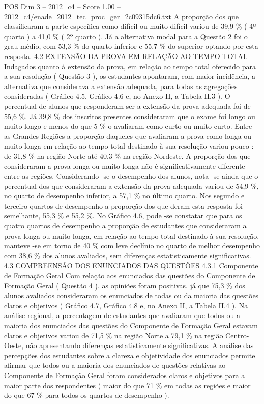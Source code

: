 \begin{textsample}{POS Dim 3 – 2012\_c4 – Score 1.00 – 2012\_c4/enade\_2012\_tec\_proc\_ger\_2c09315dc6.txt}
A proporção dos que classificaram a parte específica como difícil ou muito difícil variou de 39,9 \% ( 4º quarto ) a 41,0 \% ( 2º quarto ).
Já a alternativa modal para a Questão 2 foi o grau médio, com 53,3 \% do quarto inferior e 55,7 \% do superior optando por esta resposta. 4.2 EXTENSÃO DA PROVA EM RELAÇÃO AO TEMPO TOTAL Indagados quanto à extensão da prova, em relação ao tempo total oferecido para a sua resolução ( Questão 3 ), os estudantes apontaram, com maior incidência, a alternativa que considerava a extensão adequada, para todas as agregações consideradas ( Gráfico 4.5, Gráfico 4.6 e, no Anexo II, a Tabela II.3 ).
O percentual de alunos que responderam ser a extensão da prova adequada foi de 55,6 \%.
Já 39,8 \% dos inscritos presentes consideraram que o exame foi longo ou muito longo e menos do que 5 \% o avaliaram como curto ou muito curto.
Entre as Grandes Regiões a proporção daqueles que avaliaram a prova como longa ou muito longa em relação ao tempo total destinado à sua resolução variou pouco : de 31,8 \% na região Norte até 40,3 \% na região Nordeste.
A proporção dos que consideraram a prova longa ou muito longa não é significativamente diferente entre as regiões.
Considerando -se o desempenho dos alunos, nota -se ainda que o percentual dos que consideraram a extensão da prova adequada variou de 54,9 \%, no quarto de desempenho inferior, a 57,1 \% no último quarto.
Nos segundo e terceiro quartos de desempenho a proporção dos que deram esta resposta foi semelhante, 55,3 \% e 55,2 \%.
No Gráfico 4.6, pode -se constatar que para os quatro quartos de desempenho a proporção de estudantes que consideraram a prova longa ou muito longa, em relação ao tempo total destinado à sua resolução, manteve -se em torno de 40 \% com leve declínio no quarto de melhor desempenho com 38,6 \% dos alunos avaliados, sem diferenças estatisticamente significativas. 4.3 COMPREENSÃO DOS ENUNCIADOS DAS QUESTÕES 4.3.1 Componente de Formação Geral Com relação aos enunciados das questões do Componente de Formação Geral ( Questão 4 ), as opiniões foram positivas, já que 75,3 \% dos alunos avaliados consideraram os enunciados de todas ou da maioria das questões claros e objetivos ( Gráfico 4.7, Gráfico 4.8 e, no Anexo II, a Tabela II.4 ).
Na análise regional, a percentagem de estudantes que avaliaram que todos ou a maioria dos enunciados das questões do Componente de Formação Geral estavam claros e objetivos variou de 71,5 \% na região Norte a 79,1 \% na região Centro-Oeste, não apresentando diferenças estatisticamente significativas.
A análise das percepções dos estudantes sobre a clareza e objetividade dos enunciados permite afirmar que todos ou a maioria dos enunciados de questões relativas ao Componente de Formação Geral foram considerados claros e objetivos para a maior parte dos respondentes ( maior do que 71 \% em todas as regiões e maior do que 67 \% para todos os quartos de desempenho ).

\end{textsample}
